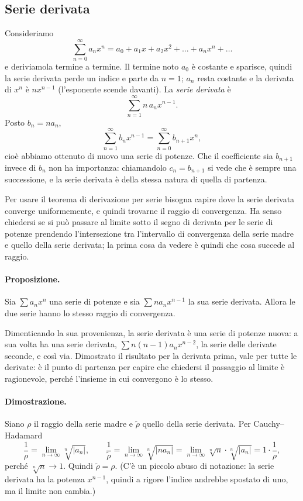 \subsection{Serie derivata}

Consideriamo
\[
  \sum_{n=0}^{\infty} a_n x^n = a_0 + a_1 x + a_2 x^2 + \dots + a_n x^n + \dots
\]
e deriviamola termine a termine.
Il termine noto $a_0$ è costante e sparisce, quindi la serie derivata perde un indice e parte da $n=1$; $a_n$
resta costante e la derivata di $x^n$ è $n x^{n-1}$ (l'esponente scende davanti). La \emph{serie derivata} è
\[
  \sum_{n=1}^{\infty} n\, a_n x^{n-1} .
\]
Posto $b_n = n a_n$,
\[
  \sum_{n=1}^{\infty} b_n x^{n-1} = \sum_{n=0}^{\infty} b_{n+1} x^n ,
\]
cioè abbiamo ottenuto di nuovo una serie di potenze.
Che il coefficiente sia $b_{n+1}$ invece di $b_n$ non ha importanza: chiamandolo $c_n = b_{n+1}$ si vede che è
sempre una successione, e la serie derivata è della stessa natura di quella di partenza.

Per usare il teorema di derivazione per serie bisogna capire dove la serie derivata converge uniformemente, e
quindi trovarne il raggio di convergenza.
Ha senso chiedersi se si può passare al limite sotto il segno di derivata per le serie di potenze prendendo
l'intersezione tra l'intervallo di convergenza della serie madre e quello della serie derivata; la prima cosa da
vedere è quindi che cosa succede al raggio.

\paragraph{Proposizione.}
Sia $\sum a_n x^n$ una serie di potenze e sia $\sum n a_n x^{n-1}$ la sua serie derivata. Allora le due serie
hanno lo stesso raggio di convergenza.

Dimenticando la sua provenienza, la serie derivata è una serie di potenze nuova: a sua volta ha una serie
derivata, $\sum n(n-1) a_n x^{n-2}$, la serie delle derivate seconde, e così via. Dimostrato il risultato per la
derivata prima, vale per tutte le derivate: è il punto di partenza per capire che chiedersi il passaggio al
limite è ragionevole, perché l'insieme in cui convergono è lo stesso.

\paragraph{Dimostrazione.}
Siano $\rho$ il raggio della serie madre e $\tilde\rho$ quello della serie derivata. Per Cauchy--Hadamard
\[
  \frac{1}{\rho} = \lim_{n\to\infty} \sqrt[n]{|a_n|} ,
  \qquad
  \frac{1}{\tilde\rho} = \lim_{n\to\infty} \sqrt[n]{|n a_n|}
  = \lim_{n\to\infty} \sqrt[n]{n}\cdot\sqrt[n]{|a_n|} = 1\cdot\frac{1}{\rho} ,
\]
perché $\sqrt[n]{n}\to 1$. Quindi $\tilde\rho = \rho$.
(C'è un piccolo abuso di notazione: la serie derivata ha la potenza $x^{n-1}$, quindi a rigore l'indice
andrebbe spostato di uno, ma il limite non cambia.)

